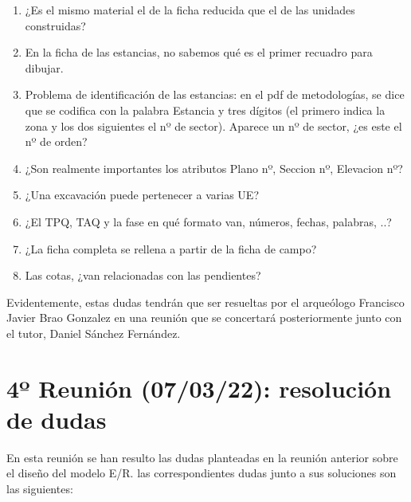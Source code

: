         \begin{enumerate}
            \item ¿Es el mismo material el de la ficha reducida que el de las unidades
            construidas?
            \item En la ficha de las estancias, no sabemos qué es el primer recuadro para
            dibujar.
            \item Problema de identificación de las estancias: en el pdf de metodologías, 
            se dice que se codifica con la palabra Estancia y tres dígitos (el primero
            indica la zona y los dos siguientes el nº de sector). Aparece un nº de sector,
            ¿es este el nº de orden?
            \item ¿Son realmente importantes los atributos Plano nº, Seccion nº, Elevacion
            nº?
            \item ¿Una excavación puede pertenecer a varias UE?
            \item ¿El TPQ, TAQ y la fase en qué formato van, números, fechas, palabras, ..?
            \item ¿La ficha completa se rellena a partir de la ficha de campo?
            \item Las cotas, ¿van relacionadas con las pendientes?
        \end{enumerate}

    Evidentemente, estas dudas tendrán que ser resueltas por el arqueólogo Francisco Javier
    Brao Gonzalez en una reunión que se concertará posteriormente junto con el tutor,
    Daniel Sánchez Fernández.

\section{4º Reunión (07/03/22): resolución de dudas}
En esta reunión se han resulto las dudas planteadas en la reunión anterior sobre el diseño
del modelo E/R. las correspondientes dudas junto a sus soluciones son las siguientes:

